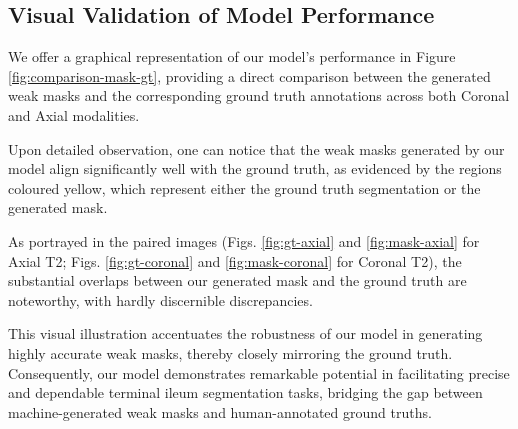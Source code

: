 \subsection{Visual Validation of Model Performance}
We offer a graphical representation of our model's performance in Figure \ref{fig:comparison-mask-gt}, providing a direct comparison between the generated weak masks and the corresponding ground truth annotations across both Coronal and Axial modalities.

Upon detailed observation, one can notice that the weak masks generated by our model align significantly well with the ground truth, as evidenced by the regions coloured yellow, which represent either the ground truth segmentation or the generated mask.

As portrayed in the paired images (Figs. \ref{fig:gt-axial} and \ref{fig:mask-axial} for Axial T2; Figs. \ref{fig:gt-coronal} and \ref{fig:mask-coronal} for Coronal T2), the substantial overlaps between our generated mask and the ground truth are noteworthy, with hardly discernible discrepancies.

This visual illustration accentuates the robustness of our model in generating highly accurate weak masks, thereby closely mirroring the ground truth. Consequently, our model demonstrates remarkable potential in facilitating precise and dependable terminal ileum segmentation tasks, bridging the gap between machine-generated weak masks and human-annotated ground truths.

